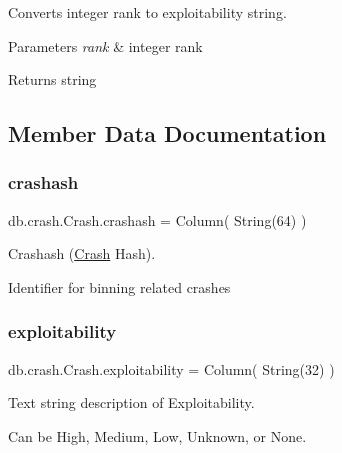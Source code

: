 Converts integer rank to exploitability string. 


\begin{DoxyParams}{Parameters}
{\em rank} & integer rank \\
\hline
\end{DoxyParams}
\begin{DoxyReturn}{Returns}
string 
\end{DoxyReturn}


\subsection{Member Data Documentation}
\mbox{\label{classdb_1_1crash_1_1_crash_abf1e1c371523cd73fac77a550f830598}} 
\subsubsection{\texorpdfstring{crashash}{crashash}}
{\footnotesize\ttfamily db.\+crash.\+Crash.\+crashash = Column( String(64) )\hspace{0.3cm}{\ttfamily [static]}}



Crashash (\mbox{\hyperlink{classdb_1_1crash_1_1_crash}{Crash}} Hash). 

Identifier for binning related crashes \mbox{\label{classdb_1_1crash_1_1_crash_a9ce9c656b02c0f83e02c77061617404e}} 
\subsubsection{\texorpdfstring{exploitability}{exploitability}}
{\footnotesize\ttfamily db.\+crash.\+Crash.\+exploitability = Column( String(32) )\hspace{0.3cm}{\ttfamily [static]}}



Text string description of Exploitability. 

Can be High, Medium, Low, Unknown, or None. \mbox{\label{classdb_1_1crash_1_1_crash_a6a80e1de8e0385b11a41f4d9a02c04d3}} 
